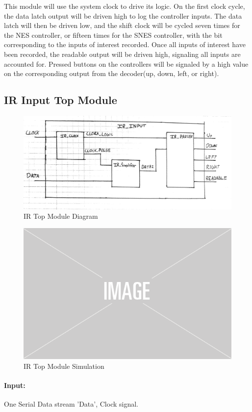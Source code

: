 \documentclass[]{article}
\begin{document}
This module will use the system clock to drive its logic. On the first clock cycle, the data latch output will be driven high to log the controller inputs. The data latch will then be driven low, and the shift clock will be cycled seven times for the NES controller, or fifteen times for the SNES controller, with the bit corresponding to the inputs of interest recorded. Once all inputs of interest have been recorded, the readable output will be driven high, signaling all inputs are accounted for. Pressed buttons on the controllers will be signaled by a high value on the corresponding output from the decoder(up, down, left, or right). 

\subsection{IR Input Top Module}
\begin{figure}[H]\centering
    \includegraphics[width=\linewidth]{figures/IR_Input_Block.jpg}
    \caption{IR Top Module Diagram}
    \label{fig:irInputDecoderBlock}
\end{figure}
\begin{figure}[H]\centering
    \includegraphics[width=0.5\linewidth]{figures/placeholder.png}
    \caption{IR Top Module Simulation}
    \label{fig:irInputDecoderSim}
\end{figure}
\paragraph{Input:} One Serial Data stream 'Data', Clock signal.
\end{document}
